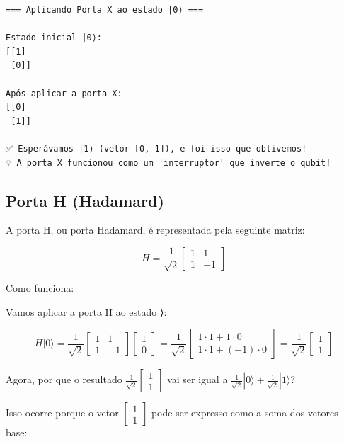 \documentclass[
  brazilian,
]{report}
\begin{document}
\begin{verbatim}
=== Aplicando Porta X ao estado |0⟩ ===

Estado inicial |0⟩:
[[1]
 [0]]

Após aplicar a porta X:
[[0]
 [1]]

✅ Esperávamos |1⟩ (vetor [0, 1]), e foi isso que obtivemos!
💡 A porta X funcionou como um 'interruptor' que inverte o qubit!
\end{verbatim}

\subsection{Porta H (Hadamard)}\label{porta-h-hadamard}

A porta H, ou porta Hadamard, é representada pela seguinte matriz:

\[H = \frac{1}{\sqrt{2}} \begin{bmatrix} 1 & 1 \\ 1 & -1 \end{bmatrix}\]

Como funciona:

Vamos aplicar a porta H ao estado ⟩:

\[H|0⟩ = \frac{1}{\sqrt{2}} \begin{bmatrix} 1 & 1 \\ 1 & -1 \end{bmatrix} \begin{bmatrix} 1 \\ 0 \end{bmatrix} = \frac{1}{\sqrt{2}} \begin{bmatrix} 1 \cdot 1 + 1 \cdot 0 \\ 1 \cdot 1 + (-1) \cdot 0 \end{bmatrix} = \frac{1}{\sqrt{2}} \begin{bmatrix} 1 \\ 1 \end{bmatrix}\]

Agora, por que o resultado
\(\frac{1}{\sqrt{2}} \begin{bmatrix} 1 \\ 1 \end{bmatrix}\) vai ser
igual a \(\frac{1}{\sqrt{2}}|0⟩ + \frac{1}{\sqrt{2}}|1⟩\)?

Isso ocorre porque o vetor \(\begin{bmatrix} 1 \\ 1 \end{bmatrix}\) pode
ser expresso como a soma dos vetores base:
\end{document}

